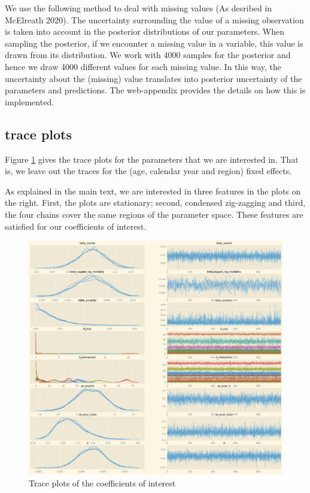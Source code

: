 \documentclass[a4paper,12pt]{article}
\makeatletter
\newcommand{\citeprocitem}[2]{\hyper@linkstart{cite}{citeproc_bib_item_#1}#2\hyper@linkend}
\makeatother
\begin{document}
We use the following method to deal with missing values (As desribed in \citeprocitem{17}{McElreath 2020}). The uncertainty surrounding the value of a missing observation is taken into account in the posterior distributions of our parameters. When sampling the posterior, if we encounter a missing value in a variable, this value is drawn from its distribution. We work with 4000 samples for the posterior and hence we draw 4000 different values for each missing value. In this way, the uncertainty about the (missing) value translates into posterior uncertainty of the parameters and predictions. The web-appendix provides the details on how this is implemented.

\subsection{trace plots}
\label{sec:orgb684b8e}

Figure \ref{fig:Trace} gives the trace plots for the parameters that we are interested in. That is, we leave out the traces for the (age, calendar year and region) fixed effects.

As explained in the main text, we are interested in three features in the plots on the right. First, the plots are stationary; second, condensed zig-zagging and third, the four chains cover the same regions of the parameter space. These features are satisfied for our coefficients of interest.

\begin{figure}[htbp]
\centering
\includegraphics[width=.9\linewidth]{./figures/trace_plot_baseline.png}
\caption{\label{fig:Trace}Trace plots of the coefficients of interest}
\end{figure}
\end{document}

